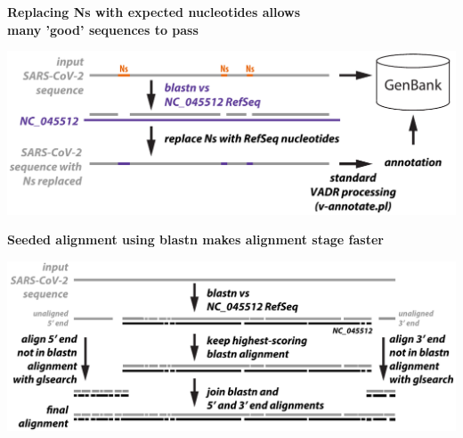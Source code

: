 \documentclass[landscape]{slides}
\begin{document}
\begin{slide}
\begin{center}
\normalsize{\textbf{Replacing Ns with expected nucleotides allows \\ many 'good' sequences to pass}}

\includegraphics[width=10.25in]{figs/vadr-r-option}
\end{center}

\vfill
\end{slide}
\begin{slide}
\begin{center}
\normalsize{\textbf{Seeded alignment using blastn makes alignment stage faster}}

\includegraphics[width=10.25in]{figs/vadr-s-option}
\end{center}

\vfill
\end{slide}
\end{document}
